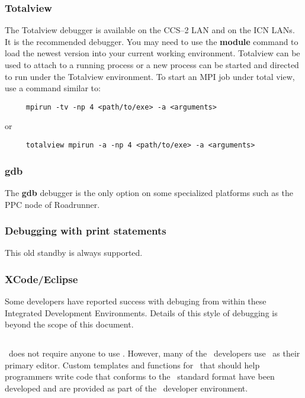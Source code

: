 \subsubsection{Totalview}

The Totalview debugger is available on the CCS--2 LAN and on the ICN
LANs.  It is the recommended debugger.  You may need to use the
\textbf{module} command to load the newest version into your current
working environment.  Totalview can be used to attach to a running
process or a new process can be started and directed to run under the
Totalview environment.  To start an MPI job under total view, use a
command similar to:
\footnotesize
\begin{verbatim}
     mpirun -tv -np 4 <path/to/exe> -a <arguments>
\end{verbatim}
\normalsize
or
\footnotesize
\begin{verbatim}
     totalview mpirun -a -np 4 <path/to/exe> -a <arguments>
\end{verbatim}
\normalsize

\subsubsection{gdb}

The \textbf{gdb} debugger is the only option on some specialized
platforms such as the PPC node of Roadrunner.

\subsubsection{Debugging with print statements}

This old standby is always supported.

\subsubsection{XCode/Eclipse}

Some developers have reported success with debuging from within these
Integrated Development Environments.  Details of this style of
debugging is beyond the scope of this document.

\subsection{\emacs}

\draco\ does not require anyone to use \emacs.  However, many of the
\draco\ developers use \emacs\ as their primary editor.  Custom
templates and functions for \emacs\ that should help programmers write
code that conforms to the \draco\ standard format have been developed
and are provided as part of the \draco\ developer environment.

